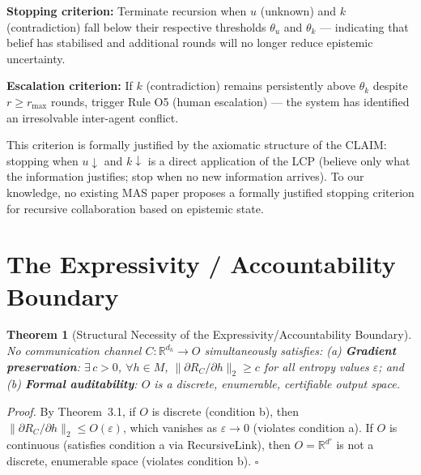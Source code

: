 \documentclass[11pt,a4paper]{article}
\theoremstyle{plain}
\newtheorem{theorem}{Theorem}[section]
\theoremstyle{definition}
\theoremstyle{remark}
\newcommand{\Real}{\mathbb{R}}
\begin{document}
\textbf{Stopping criterion:} Terminate recursion when $u$ (unknown) and $k$
(contradiction) fall below their respective thresholds $\theta_u$ and $\theta_k$
--- indicating that belief has stabilised and additional rounds will no longer
reduce epistemic uncertainty.

\textbf{Escalation criterion:} If $k$ (contradiction) remains persistently above
$\theta_k$ despite $r \ge r_\text{max}$ rounds, trigger Rule O5 (human escalation)
--- the system has identified an irresolvable inter-agent conflict.

This criterion is formally justified by the axiomatic structure of the CLAIM:
stopping when $u \downarrow$ and $k \downarrow$ is a direct application of the LCP
(believe only what the information justifies; stop when no new information arrives).
To our knowledge, no existing MAS paper proposes a formally justified stopping
criterion for recursive collaboration based on epistemic state.

\section{The Expressivity / Accountability Boundary}

\begin{keyresult}
\begin{theorem}[Structural Necessity of the Expressivity/Accountability Boundary]
No communication channel $C: \Real^{d_h} \to O$ simultaneously satisfies:
(a) \textbf{Gradient preservation}: $\exists\, c > 0$, $\forall h \in M$,
$\|\partial R_C / \partial h\|_2 \ge c$ for all entropy values $\varepsilon$; and
(b) \textbf{Formal auditability}: $O$ is a discrete, enumerable, certifiable output
space.
\end{theorem}
\end{keyresult}

\textit{Proof.}
By Theorem~3.1, if $O$ is discrete (condition b), then
$\|\partial R_C / \partial h\|_2 \le O(\varepsilon)$, which vanishes as
$\varepsilon \to 0$ (violates condition a). If $O$ is continuous (satisfies
condition a via RecursiveLink), then $O = \Real^{d'}$ is not a discrete,
enumerable space (violates condition b). $\square$
\end{document}
